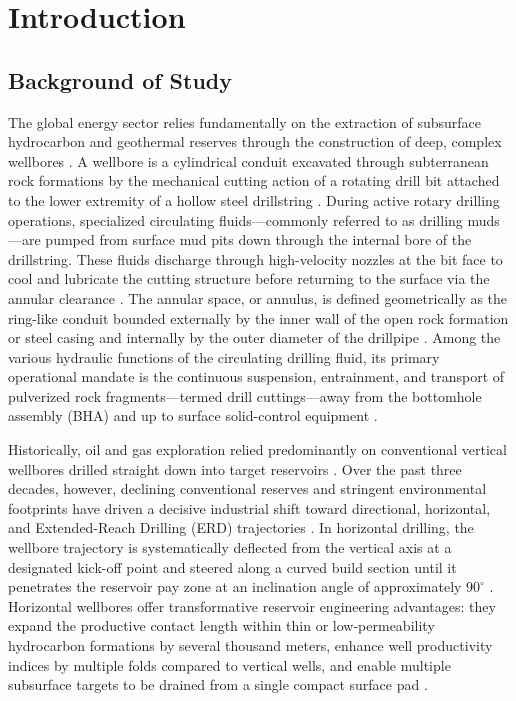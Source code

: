 
\chapter{Introduction}
\setcounter{page}{1}

\section{Background of Study}
The global energy sector relies fundamentally on the extraction of subsurface hydrocarbon and geothermal reserves through the construction of deep, complex wellbores \citep{Khaled2020, Shehab2015}. A wellbore is a cylindrical conduit excavated through subterranean rock formations by the mechanical cutting action of a rotating drill bit attached to the lower extremity of a hollow steel drillstring \citep{Shehab2015}. During active rotary drilling operations, specialized circulating fluids—commonly referred to as drilling muds—are pumped from surface mud pits down through the internal bore of the drillstring. These fluids discharge through high-velocity nozzles at the bit face to cool and lubricate the cutting structure before returning to the surface via the annular clearance \citep{Shehab2015, Ofei2015}. The annular space, or annulus, is defined geometrically as the ring-like conduit bounded externally by the inner wall of the open rock formation or steel casing and internally by the outer diameter of the drillpipe \citep{Khaled2020}. Among the various hydraulic functions of the circulating drilling fluid, its primary operational mandate is the continuous suspension, entrainment, and transport of pulverized rock fragments—termed drill cuttings—away from the bottomhole assembly (BHA) and up to surface solid-control equipment \citep{Sorgun2010, Hajipour2020}.

Historically, oil and gas exploration relied predominantly on conventional vertical wellbores drilled straight down into target reservoirs \citep{Shehab2015}. Over the past three decades, however, declining conventional reserves and stringent environmental footprints have driven a decisive industrial shift toward directional, horizontal, and Extended-Reach Drilling (ERD) trajectories \citep{Sorgun2010, Khalili2025, Saad2024}. In horizontal drilling, the wellbore trajectory is systematically deflected from the vertical axis at a designated kick-off point and steered along a curved build section until it penetrates the reservoir pay zone at an inclination angle of approximately $90^\circ$ \citep{Sorgun2010, Khaled2020}. Horizontal wellbores offer transformative reservoir engineering advantages: they expand the productive contact length within thin or low-permeability hydrocarbon formations by several thousand meters, enhance well productivity indices by multiple folds compared to vertical wells, and enable multiple subsurface targets to be drained from a single compact surface pad \citep{Khalili2025, Saad2024}.

